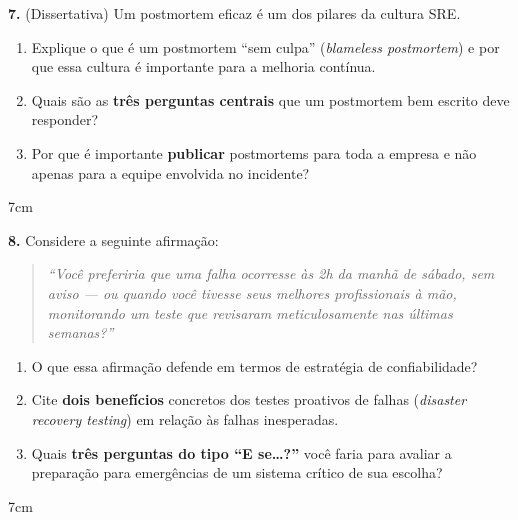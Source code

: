 \documentclass[12pt,a4paper,twoside]{report}
\begin{document}
\vspace{0.5cm}

\textbf{7.} (Dissertativa) Um postmortem eficaz é um dos pilares da cultura SRE.

\begin{enumerate}[label=\alph*)]
  \item Explique o que é um postmortem ``sem culpa'' (\textit{blameless postmortem})
        e por que essa cultura é importante para a melhoria contínua.
  \item Quais são as \textbf{três perguntas centrais} que um postmortem bem escrito
        deve responder?
  \item Por que é importante \textbf{publicar} postmortems para toda a empresa e não
        apenas para a equipe envolvida no incidente?
\end{enumerate}
\begin{resposta}{7cm}
\end{resposta}

\vspace{0.5cm}

\textbf{8.} Considere a seguinte afirmação:

\begin{quote}
  \textit{``Você preferiria que uma falha ocorresse às 2h da manhã de sábado, sem aviso
  — ou quando você tivesse seus melhores profissionais à mão, monitorando um teste
  que revisaram meticulosamente nas últimas semanas?''}
\end{quote}

\begin{enumerate}[label=\alph*)]
  \item O que essa afirmação defende em termos de estratégia de confiabilidade?
  \item Cite \textbf{dois benefícios} concretos dos testes proativos de falhas
        (\textit{disaster recovery testing}) em relação às falhas inesperadas.
  \item Quais \textbf{três perguntas do tipo ``E se\ldots?''} você faria para avaliar
        a preparação para emergências de um sistema crítico de sua escolha?
\end{enumerate}
\begin{resposta}{7cm}
\end{resposta}
\end{document}
